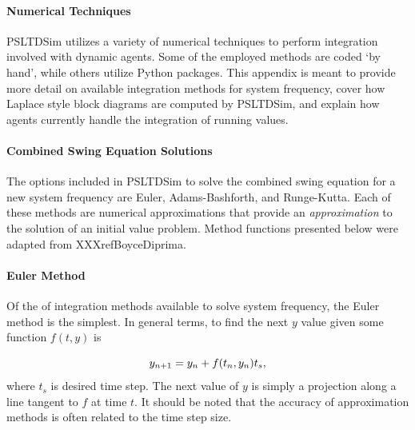 \documentclass[12pt]{article}
\begin{document}
\paragraph{Numerical Techniques} %
PSLTDSim utilizes a variety of numerical techniques to perform integration involved with dynamic agents.
Some of the employed methods are coded `by hand', while others utilize Python packages.
This appendix is meant to 
provide more detail on available integration methods for system frequency,
cover how Laplace style block diagrams are computed by PSLTDSim, 
and explain how agents currently handle the integration of running values.



\paragraph{Combined Swing Equation Solutions}
The options included in PSLTDSim to solve the combined swing equation for a new system frequency are Euler, Adams-Bashforth, and Runge-Kutta.
Each of these methods are numerical approximations that provide an \emph{approximation} to the solution of an initial value problem.
Method functions presented below were adapted from XXXrefBoyceDiprima.

\paragraph{Euler Method}
Of the of integration methods available to solve system frequency, the Euler method is the simplest.
In general terms, to find the next $y$ value given some function $f(t, y)$ is

\begin{equation}{\label{eq: generic euler} }
y_{n+1} = y_n + f(t_n, y_n)t_s,
\end{equation}%
\noindent where $t_s$ is desired time step.
The next value of $y$ is simply a projection along a line tangent to $f$ at time $t$.
It should be noted that the accuracy of approximation methods is often related to the time step size.
\end{document}
